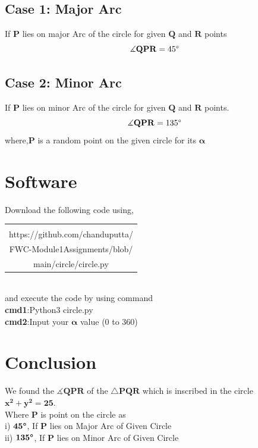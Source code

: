 \documentclass[journal,12pt,twocolumn]{article}
\let\vec\mathbf
\begin{document}
\subsection{Case 1: Major Arc} If $\vec{P}$ lies on major Arc of the circle for given $\vec{Q}$ and $\vec{R}$ points
\begin{equation}
 \vec{\measuredangle{QPR}} = 45\degree
  \label{eq-14}
\end{equation}
\subsection{Case 2: Minor Arc}
If $\vec{P}$ lies on minor Arc of the circle for given $\vec{Q}$ and $\vec{R}$ points.
\begin{equation}
\vec{\measuredangle{QPR}} = 135\degree
\label{eq-15}
\end{equation}
where,$\vec{P}$ is a random point on the given circle for its $\boldsymbol{\alpha}$\\

\section{Software}

Download the following code using,\\
{\setlength\extrarowheight{2pt}
\begin{table}[h]
    \centering
    \begin{tabular}{|c|}
    \hline \\
         https://github.com/chanduputta/\\FWC-Module1Assignments/blob/\\main/circle/circle.py  \\ 
\hline
    \end{tabular}
\end{table}
}\\
and execute the code by using command\\
\centering
\textbf{cmd1}:Python3  circle.py\\
\textbf{cmd2}:Input your $\boldsymbol{\alpha}$ value (0 to 360\degree)
\section{Conclusion}

\begin{center}
We found the  $\vec{\measuredangle{QPR}} $ of the $\vec{\triangle{PQR}}$ which is inscribed in the circle $\vec{x^2 + y^2 = 25}$.
\\Where $\vec{P}$ is  point on the circle as 
\\i) $\textbf{45\degree}$, If $\vec{P}$ lies on Major Arc of Given Circle\\
ii) $\textbf{135\degree}$, If $\vec{P}$ lies on Minor Arc of Given Circle
\end{center}
\end{document}
